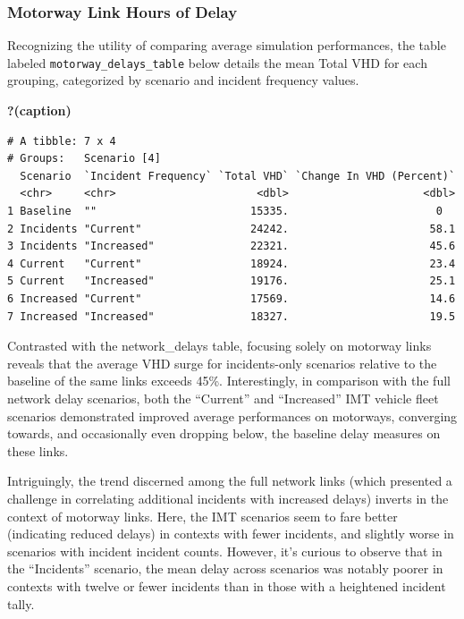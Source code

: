 \documentclass[
  letterpaper,
  authoryear]{elsarticle}
\begin{document}
\hypertarget{motorway-link-hours-of-delay}{%
\subsubsection{Motorway Link Hours of
Delay}\label{motorway-link-hours-of-delay}}

Recognizing the utility of comparing average simulation performances,
the table labeled \texttt{motorway\_delays\_table} below details the
mean Total VHD for each grouping, categorized by scenario and incident
frequency values.

\begin{table}

\caption{\textbf{?(caption)}}\begin{minipage}[t]{\linewidth}

{\centering 

\begin{verbatim}
# A tibble: 7 x 4
# Groups:   Scenario [4]
  Scenario  `Incident Frequency` `Total VHD` `Change In VHD (Percent)`
  <chr>     <chr>                      <dbl>                     <dbl>
1 Baseline  ""                        15335.                       0  
2 Incidents "Current"                 24242.                      58.1
3 Incidents "Increased"               22321.                      45.6
4 Current   "Current"                 18924.                      23.4
5 Current   "Increased"               19176.                      25.1
6 Increased "Current"                 17569.                      14.6
7 Increased "Increased"               18327.                      19.5
\end{verbatim}

}

\end{minipage}%

\end{table}

Contrasted with the network\_delays table, focusing solely on motorway
links reveals that the average VHD surge for incidents-only scenarios
relative to the baseline of the same links exceeds 45\%. Interestingly,
in comparison with the full network delay scenarios, both the
``Current'' and ``Increased'' IMT vehicle fleet scenarios demonstrated
improved average performances on motorways, converging towards, and
occasionally even dropping below, the baseline delay measures on these
links.

Intriguingly, the trend discerned among the full network links (which
presented a challenge in correlating additional incidents with increased
delays) inverts in the context of motorway links. Here, the IMT
scenarios seem to fare better (indicating reduced delays) in contexts
with fewer incidents, and slightly worse in scenarios with incident
incident counts. However, it's curious to observe that in the
``Incidents'' scenario, the mean delay across scenarios was notably
poorer in contexts with twelve or fewer incidents than in those with a
heightened incident tally.
\end{document}
